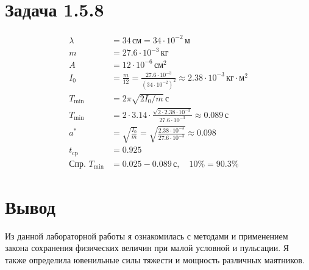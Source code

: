 \documentclass{article}
\begin{document}
\section{Задача 1.5.8}

\begin{align*}
    \lambda & = 34 \, \text{см} = 34 \cdot 10^{-2} \, \text{м} \\
    m & = 27.6 \cdot 10^{-3} \, \text{кг} \\
    A & = 12 \cdot 10^{-6} \, \text{см}^2 \\
    I_0 & = \frac{m}{12} = \frac{27.6 \cdot 10^{-3}}{(34 \cdot 10^{-2})^2} \approx 2.38 \cdot 10^{-3} \, \text{кг} \cdot \text{м}^2 \\
    T_{\text{min}} & = 2 \pi \sqrt{2I_0 / m} \, \text{с} \\
    T_{\text{min}} & = 2 \cdot 3.14 \cdot \frac{\sqrt{2 \cdot 2.38 \cdot 10^{-3}}}{27.6 \cdot 10^{-3}} \approx 0.089 \, \text{с} \\
    a^* & = \sqrt{\frac{I_0}{m}} = \sqrt{\frac{2.38 \cdot 10^{-3}}{27.6 \cdot 10^{-3}}} \approx 0.098 \\
    t_{\text{cp}} & = 0.925 \\
    \text{Спр. } T_{\text{min}} & = 0.025 - 0.089 \, \text{с}, \quad 10\% = 90.3\%
\end{align*}

\section{Вывод}
Из данной лабораторной работы я ознакомилась с методами и применением закона сохранения физических величин при малой условной и пульсации. Я также определила ювенильные силы тяжести и мощность различных маятников.
\end{document}
